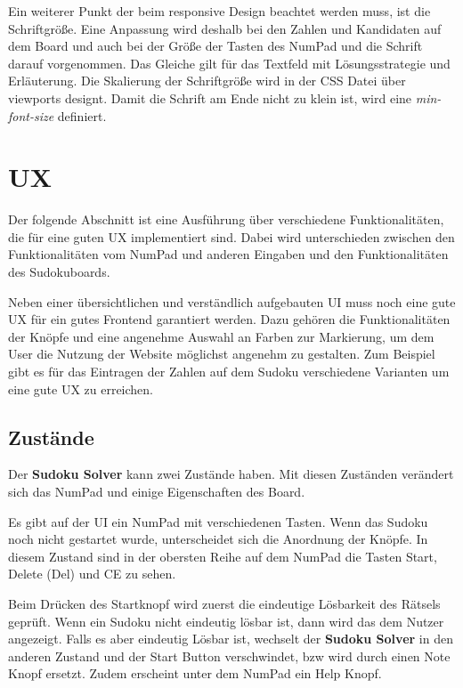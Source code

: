 Ein weiterer Punkt der beim responsive Design beachtet werden muss, ist die Schriftgröße. Eine Anpassung wird deshalb bei den Zahlen und Kandidaten auf dem Board und auch bei der Größe der Tasten des NumPad und die Schrift darauf vorgenommen. Das Gleiche gilt für das Textfeld mit Lösungsstrategie und Erläuterung. Die Skalierung der Schriftgröße wird in der \ac{CSS} Datei über viewports designt. Damit die Schrift am Ende nicht zu klein ist, wird eine \textit{min-font-size} definiert. 


\section{\acl{UX}}
Der folgende Abschnitt ist eine Ausführung über verschiedene Funktionalitäten, die für eine guten \acl{UX} implementiert sind. Dabei wird unterschieden zwischen den Funktionalitäten vom NumPad und anderen Eingaben und den Funktionalitäten des Sudokuboards.

Neben einer übersichtlichen und verständlich aufgebauten \ac{UI} muss noch eine gute \ac{UX} für ein gutes Frontend garantiert werden. Dazu gehören die Funktionalitäten der Knöpfe und eine angenehme Auswahl an Farben zur Markierung, um dem User die Nutzung der Website möglichst angenehm zu gestalten. Zum Beispiel gibt es für das Eintragen der Zahlen auf dem Sudoku verschiedene Varianten um eine gute \ac{UX} zu erreichen. 

\subsection{Zustände}

Der \textbf{Sudoku Solver} kann zwei Zustände haben. Mit diesen Zuständen verändert sich das NumPad und einige Eigenschaften des Board. 

Es gibt auf der \ac{UI} ein NumPad mit verschiedenen Tasten. Wenn das Sudoku noch nicht gestartet wurde, unterscheidet sich die Anordnung der Knöpfe. In diesem Zustand sind in der obersten Reihe auf dem NumPad die Tasten Start, Delete (Del) und \ac{CE} zu sehen. 

Beim Drücken des Startknopf wird zuerst die eindeutige Lösbarkeit des Rätsels geprüft. Wenn ein Sudoku nicht eindeutig lösbar ist, dann wird das dem Nutzer angezeigt. Falls es aber eindeutig Lösbar ist, wechselt der \textbf{Sudoku Solver} in den anderen Zustand und der Start Button verschwindet, bzw wird durch einen Note Knopf ersetzt. Zudem erscheint unter dem NumPad ein Help Knopf. 

